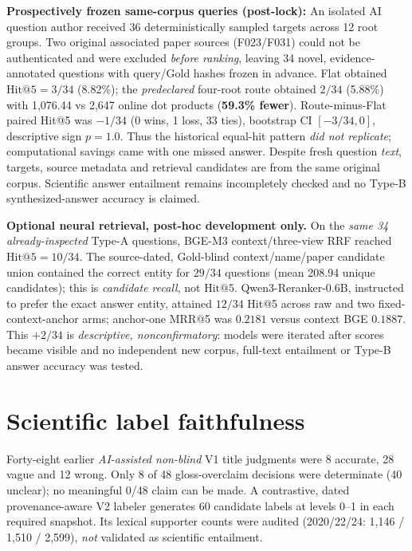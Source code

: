 \documentclass[10pt,twocolumn]{article}
\begin{document}
\textbf{Prospectively frozen same-corpus queries (post-lock):} An isolated AI question author received 36 deterministically sampled targets across 12 root groups. Two original associated paper sources (F023/F031) could not be authenticated and were excluded \emph{before ranking}, leaving 34 novel, evidence-annotated questions with query/Gold hashes frozen in advance. Flat obtained \(\mathrm{Hit@5}=3/34\) (8.82\%); the \emph{predeclared} four-root route obtained \(2/34\) (5.88\%) with 1,076.44 vs 2,647 online dot products (\textbf{59.3\% fewer}). Route-minus-Flat paired Hit@5 was \(-1/34\) (0 wins, 1 loss, 33 ties), bootstrap CI \([-3/34,0]\), descriptive sign \(p=1.0\). Thus the historical equal-hit pattern \emph{did not replicate}; computational savings came with one missed answer. Despite fresh question \emph{text}, targets, source metadata and retrieval candidates are from the same original corpus. Scientific answer entailment remains incompletely checked and no Type-B synthesized-answer accuracy is claimed.

\noindent\textbf{Optional neural retrieval, post-hoc development only.}
On the \emph{same 34 already-inspected} Type-A questions, BGE-M3 context/three-view RRF reached \(\mathrm{Hit@5}=10/34\). The source-dated, Gold-blind context/name/paper candidate union contained the correct entity for \(29/34\) questions (mean 208.94 unique candidates); this is \emph{candidate recall}, not \(\mathrm{Hit@5}\). Qwen3-Reranker-0.6B, instructed to prefer the exact answer entity, attained \(12/34\) Hit@5 across raw and two fixed-context-anchor arms; anchor-one MRR@5 was \(0.2181\) versus context BGE \(0.1887\). This \(+2/34\) is \emph{descriptive, nonconfirmatory}: models were iterated after scores became visible and no independent new corpus, full-text entailment or Type-B answer accuracy was tested.

\section{Scientific label faithfulness}
Forty-eight earlier \emph{AI-assisted non-blind} V1 title judgments were 8 accurate, 28 vague and 12 wrong. Only 8 of 48 gloss-overclaim decisions were determinate (40 unclear); no meaningful 0/48 claim can be made. A contrastive, dated provenance-aware V2 labeler generates 60 candidate labels at levels 0--1 in each required snapshot. Its lexical supporter counts were audited (2020/22/24: 1,146 / 1,510 / 2,599), \emph{not} validated as scientific entailment.
\end{document}

